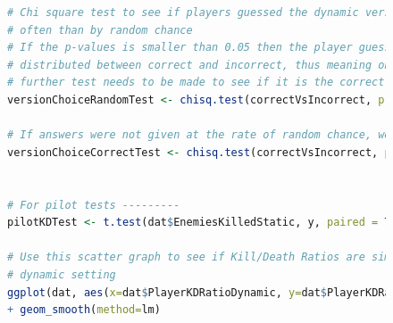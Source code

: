 \documentclass[journal]{IEEEtran}
\begin{document}
\begin{center}
\begin{figure}
\begin{lstlisting}[language=R]
# Chi square test to see if players guessed the dynamic version correctly more significantly
# often than by random chance
# If the p-values is smaller than 0.05 then the player guesses are significantly not commonly
# distributed between correct and incorrect, thus meaning one is significantly higher and a
# further test needs to be made to see if it is the correct answer
versionChoiceRandomTest <- chisq.test(correctVsIncorrect, p = c(1/2, 1/2))

# If answers were not given at the rate of random chance, were answers more often correct?
versionChoiceCorrectTest <- chisq.test(correctVsIncorrect, p = c(4/5, 1/5))


# For pilot tests ---------
pilotKDTest <- t.test(dat$EnemiesKilledStatic, y, paired = TRUE, alternative = "two.sided")

# Use this scatter graph to see if Kill/Death Ratios are similar between players using the
# dynamic setting
ggplot(dat, aes(x=dat$PlayerKDRatioDynamic, y=dat$PlayerKDRatioDynamic)) + geom_point() 
+ geom_smooth(method=lm)


\end{lstlisting}

\end{figure}

\end{center}
 
\end{document}
